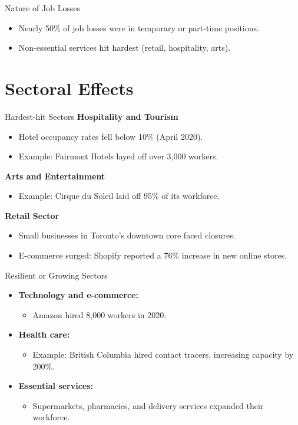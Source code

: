 \documentclass{beamer}
\begin{document}
\begin{frame}{Nature of Job Losses}
    \begin{itemize}
        \item Nearly 50\% of job losses were in temporary or part-time positions.
        \item Non-essential services hit hardest (retail, hospitality, arts).
    \end{itemize}
\end{frame}

\section{Sectoral Effects}
\begin{frame}{Hardest-hit Sectors}
    \textbf{Hospitality and Tourism}
    \begin{itemize}
        \item Hotel occupancy rates fell below 10\% (April 2020).
        \item Example: Fairmont Hotels layed off over 3,000 workers.
    \end{itemize}
    \textbf{Arts and Entertainment}
    \begin{itemize}
        \item Example: Cirque du Soleil laid off 95\% of its workforce.
    \end{itemize}
    \textbf{Retail Sector}
    \begin{itemize}
        \item Small businesses in Toronto's downtown core faced closures.
        \item E-commerce surged: Shopify reported a 76\% increase in new online stores.
    \end{itemize}
\end{frame}

\begin{frame}{Resilient or Growing Sectors}
    \begin{itemize}
        \item \textbf{Technology and e-commerce:}
        \begin{itemize}
            \item Amazon hired 8,000 workers in 2020.
        \end{itemize}
        \item \textbf{Health care:}
        \begin{itemize}
            \item Example: British Columbia hired contact tracers, increasing capacity by 200\%.
        \end{itemize}
        \item \textbf{Essential services:}
        \begin{itemize}
            \item Supermarkets, pharmacies, and delivery services expanded their workforce.
        \end{itemize}
    \end{itemize}
\end{frame}
\end{document}
